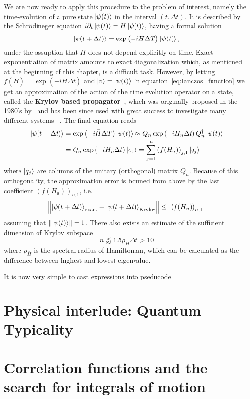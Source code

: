 We are now ready to apply this procedure to the problem of interest, namely the time-evolution of a pure
state \(\ket{\psi(t)}\) in the interval \(\left(t, \Delta t\right)\). It is described by the Schr{\"o}dineger equation
\(i\partial_t \ket{\psi(t)} = \bar{H} \ket{\psi(t)}\), having a formal solution
\begin{equation}
	\ket{\psi(t+\Delta t)} = \exp\left(-i \bar{H} \Delta T\right) \ket{\psi(t)},	
\end{equation}
under the assuption that \(\bar{H}\) does not depend explicitly on time. Exact exponentiation of matrix amounts to exact
diagonalization which, as mentioned at the beginning of this chapter, is a difficult task. However, by letting \(f(\bar{H}) = 
\exp\left(-i \bar{H} \Delta t\right)\) and \(\ket{v} = \ket{\psi(t)}\) in equation~\eqref{eq:lanczos_function} we
get an approximation of the action of the time
evolution operator on a state, called the \textbf{Krylov based propagator}~\autocite{Moler2003}, which was 
originally proposed in the 1980's by~\textcite{Park1986} and has been since used with great success to 
investigate many different systems ~\autocite{Schmitteckert2004,Stanek2013,Zaletel2015,Dargel2012}. The final equation
reads
\begin{align}
	\ket{\psi(t+\Delta t)} &= \exp\left(-i \bar{H} \Delta T\right) \ket{\psi(t)} \approx
	Q_n \exp\left(-i H_n \Delta t\right) Q_n^{\dagger}\ket{\psi(t)}\\
	 &= Q_n \exp\left(-i H_n \Delta t\right) \ket{e_1} = \sum_{j=1}^{n} \left(f(H_n)\right)_{j,1} \ket{q_j}
\end{align} 
where \(\ket{q_j}\) are columns of the unitary (orthogonal) matrix \(Q_n\). Because of this orthogonality,
the approximation error is bouned from above by the last coefficient \(\left(f(H_n)\right)_{n,1}\), i.e.
\begin{equation}
	\norm{\ket{\psi(t+\Delta t)}_{\textrm{exact}} - \ket{\psi(t+\Delta t)}_{\textrm{Krylov}}} \leq \abs{\left(f(H_n)\right)_{n,1}}
\end{equation}
assuming that \(\norm{\ket{\psi(t)}} = 1\). There also exists an estimate of the sufficient dimension of Krylov
subspace~\autocite{Mohankumar2006}
\begin{equation}
	n \lessapprox 1.5 \rho_{\bar{H}} \Delta t > 10
\end{equation}
where \(\rho_{\bar{H}}\) is the spectral radius of Hamiltonian, which can be calculated as the difference between highest and lowest eigenvalue.

It is now very simple to cast expressions into pseducode







\section{Physical interlude: Quantum Typicality}

\section{Correlation functions and the search for integrals of motion}


